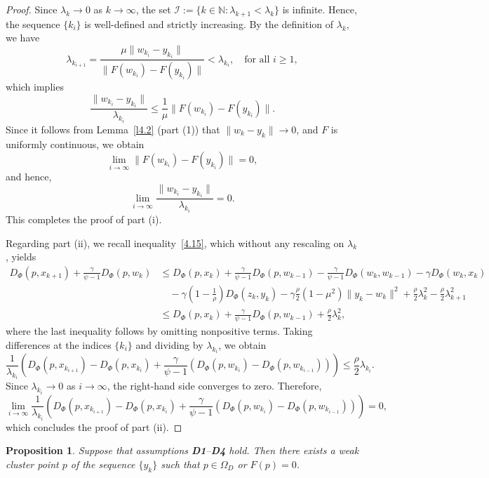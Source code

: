 \documentclass[hidelinks,11 pt]{article}
\numberwithin{equation}{section}
\newtheorem{proposition}[theorem]{Proposition}
\theoremstyle{definition}  %
\numberwithin{equation}{section}
\numberwithin{theorem}{section}
\begin{document}
\begin{proof}
    Since $\lambda_k \to 0$ as $k \to \infty$, the set $\mathcal{I} := \{k \in \mathbb{N} : \lambda_{k+1} < \lambda_k\}$ is infinite. Hence, the sequence $\{k_i\}$ is well-defined and strictly increasing. By the definition of $\lambda_k$, we have
    \[
        \lambda_{k_{i+1}} = \frac{\mu \|w_{k_i} - y_{k_i}\|}{\|F(w_{k_i}) - F(y_{k_i})\|} < \lambda_{k_i}, \quad \text{for all } i \geq 1,
    \]
    which implies
    \[
        \frac{\|w_{k_i} - y_{k_i}\|}{\lambda_{k_i}} \leq \frac{1}{\mu} \|F(w_{k_i}) - F(y_{k_i})\|.
    \]
    Since it follows from Lemma~\ref{l4.2} (part (1)) that $\|w_k - y_k\| \to 0$, and $F$ is uniformly continuous, we obtain
    \[
        \lim_{i \to \infty} \|F(w_{k_i}) - F(y_{k_i})\| = 0,
    \]
    and hence,
    \[
        \lim_{i \to \infty} \frac{\|w_{k_i} - y_{k_i}\|}{\lambda_{k_i}} = 0.
    \]
    This completes the proof of part (i).

    \vskip 2mm
    Regarding part (ii), we recall inequality~\eqref{4.15}, which without any rescaling on $\lambda_k$, yields
   \begin{align*}
    D_{\Phi}(p,x_{k+1})+\frac{\gamma}{\psi-1}D_{\Phi}(p,w_{k})&\leq  D_{\Phi}(p,x_{k})+\frac{\gamma}{\psi-1}D_{\Phi}(p,w_{k-1})-\frac{\gamma}{\psi-1}D_{\Phi}(w_{k},w_{k-1})-\gamma D_{\Phi}(w_{k},x_{k})\\
    &\quad -\gamma(1-\frac{1}{\rho})D_{\Phi}(z_k, y_k)-\gamma\frac{\rho}{2}(1-\mu^2)\|y_{k}-w_{k}\|^2 +\frac{\rho}{2}\lambda_{k}^2-\frac{\rho}{2}\lambda_{k+1}^2\\
    &\leq D_{\Phi}(p,x_{k})+\frac{\gamma}{\psi-1}D_{\Phi}(p,w_{k-1})+\frac{\rho}{2}\lambda_{k}^2, 
\end{align*}
    where the last inequality follows by omitting nonpositive terms. Taking differences at the indices $\{k_i\}$ and dividing by $\lambda_{k_i}$, we obtain
    \[
        \frac{1}{\lambda_{k_i}} \left( D_{\Phi}(p, x_{k_{i+1}}) - D_{\Phi}(p, x_{k_i}) + \frac{\gamma}{\psi - 1} (D_{\Phi}(p, w_{k_i}) - D_{\Phi}(p, w_{k_{i-1}})) \right) \leq \frac{\rho}{2} \lambda_{k_i}.
    \]
    Since $\lambda_{k_i} \to 0$ as $i \to \infty$, the right-hand side converges to zero. Therefore,
    \[
        \lim_{i \to \infty} \frac{1}{\lambda_{k_i}} \left( D_{\Phi}(p, x_{k_{i+1}}) - D_{\Phi}(p, x_{k_i}) + \frac{\gamma}{\psi - 1} (D_{\Phi}(p, w_{k_i}) - D_{\Phi}(p, w_{k_{i-1}})) \right) = 0,
    \]
    which concludes the proof of part (ii).
\end{proof}
\begin{proposition}\label{p4.4}
    Suppose that assumptions \textbf{D1}–\textbf{D4} hold. Then there exists a weak cluster point \( p \) of the sequence \( \{y_k\} \) such that \( p \in \Omega_D \) or \( F(p) = 0 \).
\end{proposition}
\end{document}
